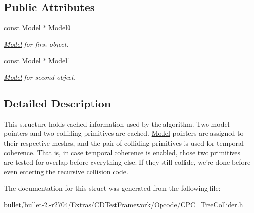 \subsection*{Public Attributes}
\begin{DoxyCompactItemize}
\item 
\hypertarget{struct_b_v_t_cache_a69f8d5a7613435e6c58a6816ecd15e0a}{const \hyperlink{class_model}{Model} $\ast$ \hyperlink{struct_b_v_t_cache_a69f8d5a7613435e6c58a6816ecd15e0a}{Model0}}\label{struct_b_v_t_cache_a69f8d5a7613435e6c58a6816ecd15e0a}

\begin{DoxyCompactList}\small\item\em \hyperlink{class_model}{Model} for first object. \end{DoxyCompactList}\item 
\hypertarget{struct_b_v_t_cache_a092159126dbd147d9488f881e675fea0}{const \hyperlink{class_model}{Model} $\ast$ \hyperlink{struct_b_v_t_cache_a092159126dbd147d9488f881e675fea0}{Model1}}\label{struct_b_v_t_cache_a092159126dbd147d9488f881e675fea0}

\begin{DoxyCompactList}\small\item\em \hyperlink{class_model}{Model} for second object. \end{DoxyCompactList}\end{DoxyCompactItemize}


\subsection{Detailed Description}
This structure holds cached information used by the algorithm. Two model pointers and two colliding primitives are cached. \hyperlink{class_model}{Model} pointers are assigned to their respective meshes, and the pair of colliding primitives is used for temporal coherence. That is, in case temporal coherence is enabled, those two primitives are tested for overlap before everything else. If they still collide, we're done before even entering the recursive collision code. 

The documentation for this struct was generated from the following file\+:\begin{DoxyCompactItemize}
\item 
bullet/bullet-\/2.-\/r2704/\+Extras/\+C\+D\+Test\+Framework/\+Opcode/\hyperlink{_o_p_c___tree_collider_8h}{O\+P\+C\+\_\+\+Tree\+Collider.\+h}\end{DoxyCompactItemize}
